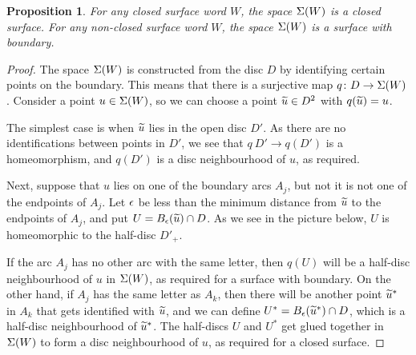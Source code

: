 \documentclass[reqno]{amsart}
\newtheorem{proposition}[theorem]{Proposition}
\theoremstyle{definition}
\begin{document}
\begin{proposition}\label{prop-Sg-surf}
 For any closed surface word $W$, the space $\Sigma(W)$ is a closed
 surface.  For any non-closed surface word $W$, the space $\Sigma(W)$ is
 a surface with boundary.
\end{proposition}
\begin{proof}
 The space $\Sigma(W)$ is constructed from the disc $D$ by identifying
 certain points on the boundary.  This means that there is a
 surjective map $q\colon D\to\Sigma(W)$.  Consider a point $u\in\Sigma(W)$, so
 we can choose a point $\widetilde{u}\in D^2$ with $q(\widetilde{u})=u$.  

 The simplest case is when $\widetilde{u}$ lies in the open disc $D'$.  As there
 are no identifications between points in $D'$, we see that
 $q\:D'\to q(D')$ is a homeomorphism, and $q(D')$ is a disc
 neighbourhood of $u$, as required.

 Next, suppose that $u$ lies on one of the boundary arcs $A_j$, but
 not it is not one of the endpoints of $A_j$.  Let $\epsilon$ be less than
 the minimum distance from $\widetilde{u}$ to the endpoints of $A_j$, and put
 $U=B_\epsilon(\widetilde{u})\cap D$.  As we see in the picture below, $U$ is
 homeomorphic to the half-disc $D'_+$.  
 \begin{center}
 \end{center}
 If the arc $A_j$ has no other arc with the same letter, then $q(U)$
 will be a half-disc neighbourhood of $u$ in $\Sigma(W)$, as required for
 a surface with boundary.  On the other hand, if $A_j$ has the same
 letter as $A_k$, then there will be another point $\widetilde{u}^*$ in $A_k$
 that gets identified with $\widetilde{u}$, and we can define
 $U^*=B_{\epsilon}(\widetilde{u}^*)\cap D$, which is a half-disc neighbourhood of
 $\widetilde{u}^*$.  The half-discs $U$ and $U^*$ get glued together in $\Sigma(W)$
 to form a disc neighbourhood of $u$, as required for a closed
 surface. 


\end{proof}
\end{document}
